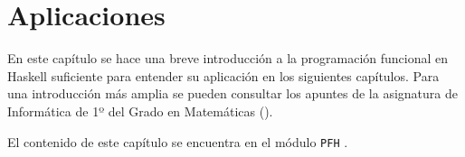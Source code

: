 \chapter{Aplicaciones}\label{sec:progfunHas}

En este capítulo se hace una breve introducción a la programación funcional en
Haskell suficiente para entender su aplicación en los siguientes
capítulos. Para una introducción más amplia se pueden consultar los apuntes de
la asignatura de Informática de 1º del Grado en Matemáticas
(\cite{Alonso-15b}). 

El contenido de este capítulo se encuentra en el módulo \texttt{PFH} 
.

